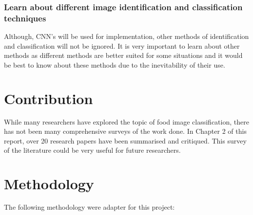 \tocless\subsubsection{Learn about different image identification and classification techniques}
Although, CNN's will be used for implementation, other methods of identification and classification will not be ignored.
It is very important to learn about other methods as different methods
are better suited for some situations and it would be best to know about these methods due to the inevitability of their use.

\section{Contribution}
While many researchers have explored the topic of food image classification, there has not been many comprehensive surveys of the work done.
In Chapter 2 of this report, over 20 research papers have been summarised and critiqued.
This survey of the literature could be very useful for future researchers. 

\section{Methodology}
The following methodology were adapter for this project:

